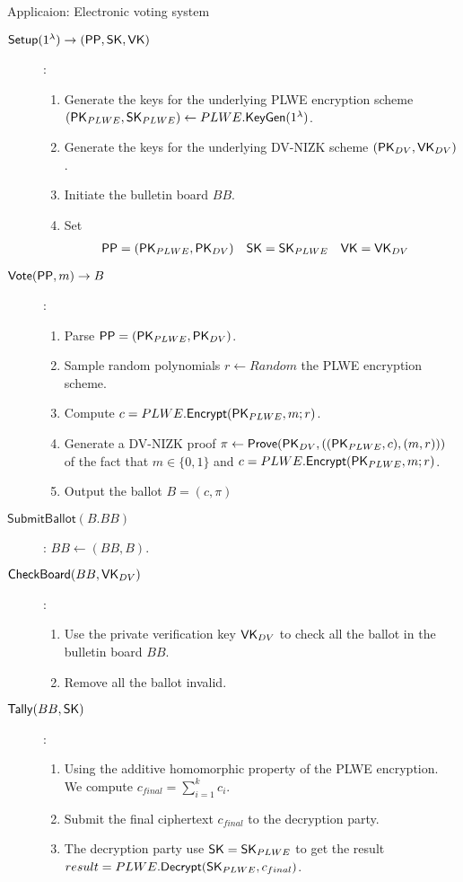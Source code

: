 \begin{section}{Applicaion: Electronic voting system}
  \begin{description}
    \item[$\mathsf{Setup}(1^\lambda) \to ( {\mathsf{PP}}, \mathsf{SK}, \mathsf{VK})$]:
    \begin{enumerate}
      \item Generate the keys for the underlying PLWE encryption scheme $(\mathsf{PK}_{PLWE}, \mathsf{SK}_{PLWE}) \gets PLWE.{\mathsf{KeyGen}}(1^\lambda)$.
      \item Generate the keys for the underlying DV-NIZK scheme $(\mathsf{PK}_{DV}, \mathsf{VK}_{DV})$.
      \item Initiate the bulletin board $BB$.
      \item Set
      \begin{align*}
        {\mathsf{PP}} &= (\mathsf{PK}_{PLWE}, \mathsf{PK}_{DV}) & \mathsf{SK} &= \mathsf{SK}_{PLWE} & \mathsf{VK} &= \mathsf{VK}_{DV}
      \end{align*}
    \end{enumerate}
    \item[$\mathsf{Vote}({\mathsf{PP}}, m) \to B$]:
    \begin{enumerate}
      \item Parse ${\mathsf{PP}} = (\mathsf{PK}_{PLWE}, \mathsf{PK}_{DV})$.
      \item Sample random polynomials $r \gets Random$ \wrt the PLWE encryption scheme.
      \item Compute $c = PLWE.{\mathsf{Encrypt}}(\mathsf{PK}_{PLWE}, m; r)$.
      \item Generate a DV-NIZK proof $\pi \gets {\mathsf{Prove}}(\mathsf{PK}_{DV}, ((\mathsf{PK}_{PLWE}, c), (m, r)))$ of the fact that $m \in \{0,1\}$ and $c = PLWE.{\mathsf{Encrypt}}(\mathsf{PK}_{PLWE}, m; r)$.
      \item Output the ballot $B = (c, \pi)$
    \end{enumerate}
    \item[$\mathsf{SubmitBallot}(B. BB)$]: $BB \gets (BB, B)$.
    \item[$\mathsf{CheckBoard}(BB, \mathsf{VK}_{DV})$]:
    \begin{enumerate}
      \item Use the private verification key $\mathsf{VK}_{DV}$ to check all the ballot in the bulletin board $BB$.
      \item Remove all the ballot invalid.
    \end{enumerate}
    \item[$\mathsf{Tally}(BB, \mathsf{SK})$]:
    \begin{enumerate}
      \item Using the additive homomorphic property of the PLWE encryption. We compute $c_{final} = \sum_{i = 1}^k c_i$.
      \item Submit the final ciphertext $c_{final}$ to the decryption party.
      \item The decryption party use $\mathsf{SK} = \mathsf{SK}_{PLWE}$ to get the result $result = PLWE.{\mathsf{Decrypt}}(\mathsf{SK}_{PLWE}, c_{final})$.
    \end{enumerate}
  \end{description}
\end{section}
